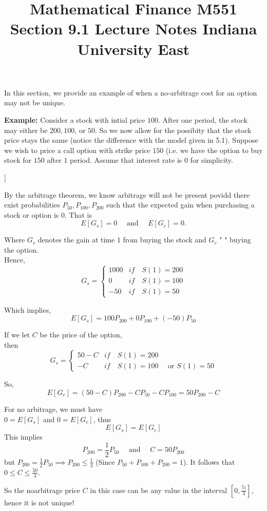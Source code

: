 \documentclass[10 pt, a4paper]{article}
\begin{document}
\title{Mathematical Finance M551 \linebreak Section 9.1 Lecture Notes \linebreak Indiana University East}
\author{}
\date{}
\maketitle
In this section, we provide an example of when a no-arbitrage cost for an option may not be unique.

\textbf{Example:} Consider a stock with intial price $100$. After one period, the stock may either be $200,100$, or $50$. So we now allow for the possibity that the stock price stays the same (notice the difference with the model given in 5.1). Suppose we wish to price a call option with strike price $150$ (i.e. we have the option to buy stock for $150$ after $1$ period. Assume that interest rate is $0$ for simplicity.\\
\begin{forest}
	[100
	[200]
	[100]
	[50]
	]
\end{forest}

By the arbitrage theorem, we know arbitrage will not be present povidd there exist probabilities $P_{50},P_{100},P_{200}$ such that the expected gain when purchasing a stock or option is $0$. That is
$$E[G_s]=0\quad \text{ and }\quad E[G_c]=0.$$

Where $G_s$ denotes the gain at time $1$ from buying the stock and $G_c$ "  " buying the option. \\

Hence,
\[G_s=\begin{cases}
	1000&if\quad S(1)=200\\
	0&if\quad S(1)=100\\
	-50&if\quad S(1)=50
\end{cases}
\]

Which implies,
$$E[G_s]=100P_{200}+0P_{100}+(-50)P_{50}$$

If we let $C$ be the price of the option, \\

then
\[G_s=\begin{cases}
	50-C&if\quad S(1)=200\\
	-C&if\quad S(1)=100\quad\text{ or }S(1)=50
\end{cases}
\]


So, $$E[G_c]=(50-C)P_200-CP_{50}-CP_{100}=50P_{200}-C$$

For no arbitrage, we must have\\
$0=E[G_s]$ and $0=E[G_c]$, thus\\
$$E[G_s]=E[G_c]$$
This implies
$$P_{200}=\frac 12P_{50}\quad\text{ and }\quad C=50P_{200}$$
but $P_{200}=\frac 12 P_{50}\implies P_{200}\leq \frac 13$
(Since $P_{50}+P_{100}+P_{200}=1$). It follows that $0\leq C\leq\frac{50}{3}$.

So the noarbitrage price $C$ in this case can be any value in the interval $[0,\frac{5)}{3}]$, hence it is not unique!
\end{document}
